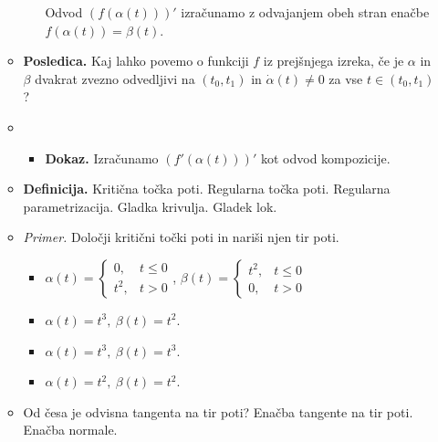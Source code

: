 \begin{enumerate}
\begin{itemize}
\begin{itemize}
            Odvod $(f(\alpha (t)))'$ izračunamo z odvajanjem obeh stran enačbe $f(\alpha (t)) = \beta (t)$.
        \end{itemize}
        \item \colorbox{orange!30}{\textbf{Posledica.}} Kaj lahko povemo o funkciji $f$ iz prejšnjega izreka, če je $\alpha$ in $\beta$ dvakrat zvezno odvedljivi na $(t_0, t_1)$ in $\dot{\alpha}(t) \neq 0$ za vse $t \in (t_0, t_1)$?
        \item \begin{itemize}
            \item \colorbox{green!30}{\textbf{Dokaz.}} Izračunamo $(f'(\alpha (t)))'$ kot odvod kompozicije.
        \end{itemize}
        \item \colorbox{purple!30}{\textbf{Definicija.}} Kritična točka poti. Regularna točka poti. Regularna parametrizacija. Gladka krivulja. Gladek lok.
        \item \colorbox{yellow!30}{\emph{Primer.}} Določji kritični točki poti in nariši njen tir poti. 
        \begin{itemize}
            \item $\alpha (t) = \begin{cases}
                0, & t \leq 0 \\
                t^2, & t > 0
            \end{cases}$, $\beta (t) = \begin{cases}
                t^2, & t \leq 0 \\
                0, & t > 0
            \end{cases}$
            \item $\alpha (t) = t^3, \ \beta(t) = t^2$.
            \item $\alpha (t) = t^3, \ \beta(t) = t^3$.
            \item $\alpha (t) = t^2, \ \beta(t) = t^2$.
        \end{itemize}
        \item Od česa je odvisna tangenta na tir poti? Enačba tangente na tir poti. Enačba normale.
    \end{itemize}
\end{enumerate}